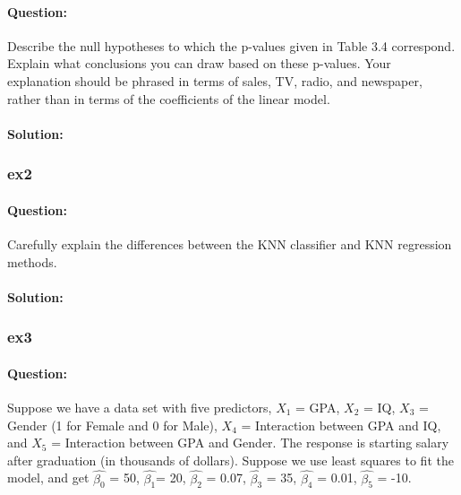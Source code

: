 \documentclass[a4paper,12pt,titlepage]{article} %
\begin{document}
\paragraph{Question:} Describe the null hypotheses to which the p-values given in Table 3.4 correspond. Explain what conclusions you can draw based on these p-values. Your explanation should be phrased in terms of sales, TV, radio, and newspaper, rather than in terms of the coefficients of the
linear model.

\paragraph{Solution:}

\subsubsection{ex2}
\paragraph{Question:} Carefully explain the differences between the KNN classifier and KNN
regression methods.

\paragraph{Solution:}

\subsubsection{ex3}
\paragraph{Question:} Suppose we have a data set with five predictors, $X_{1}$ = GPA, $X_{2}$ = IQ, $X_{3}$ = Gender (1 for Female and 0 for Male), $X_{4}$ = Interaction between GPA and IQ, and $X_{5}$ = Interaction between GPA and Gender. The response is starting salary after graduation (in thousands of dollars). Suppose we use least squares to fit the model, and get $\hat{\beta_{0}}$ = 50, $\hat{\beta_{1}}$= 20, $\hat{\beta_{2}}$ = 0.07, $\hat{\beta_{3}}$ = 35, $\hat{\beta_{4}}$ = 0.01, $\hat{\beta_{5}}$ = -10.
\end{document}
